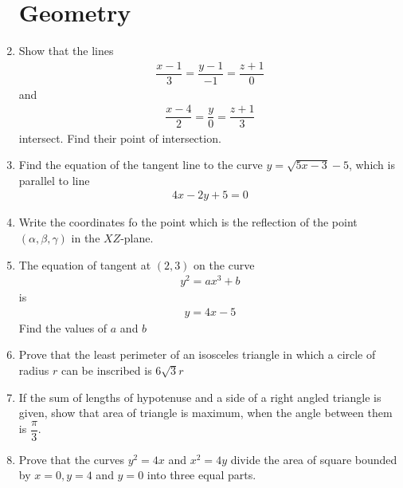 \documentclass[12pt,-letter paper]{article}
\theoremstyle{remark}
\providecommand{\brak}[1]{\ensuremath{\left(#1\right)}}
\begin{document}
\begin{enumerate}
            \section{Geometry}
      \item Show that the lines
            \begin{align*}
                  \dfrac{x-1}{3}= \dfrac{y-1}{-1} = \dfrac{z+1}{0}
            \end{align*}
            and
            \begin{align*}
                  \dfrac{x-4}{2}= \dfrac{y}{0} = \dfrac{z+1}{3}
            \end{align*}
            intersect. Find their point of intersection.
      \item Find the equation of the tangent line to the curve $y=\sqrt{5x-3} -5$, which is parallel to line
            \begin{align*}
                  4x-2y+5=0
            \end{align*}
      \item Write the coordinates fo the point which is the reflection of the point \brak{\alpha,\beta,\gamma} in the $XZ$-plane.
      \item The equation of tangent at \brak{2,3} on the curve
            \begin{align*}
                  y^2 = ax^3 + b
            \end{align*}
            is
            \begin{align*}
                  y = 4x -5
            \end{align*}
            Find the values of $a$ and $b$
      \item Prove that the least perimeter of an isosceles triangle in which a circle of radius $r$ can be inscribed is $6 \sqrt{3} r$
      \item If the sum of lengths of hypotenuse and a side of a right angled triangle is given, show that area of triangle is maximum, when the angle between them is $\dfrac{\pi}{3}$.
      \item Prove that the curves $y^2=4x$ and $x^2= 4y$ divide the area of square bounded by $x=0,y=4$ and $y=0$ into three equal parts.

\end{enumerate}
\end{document}
